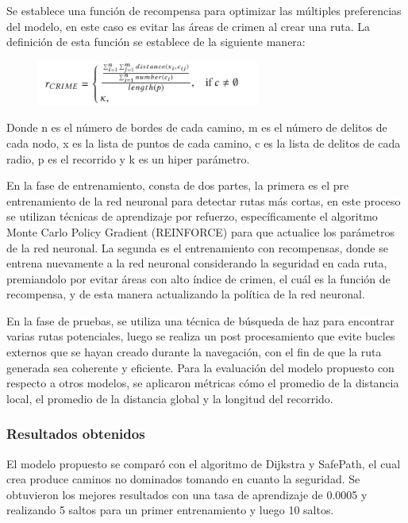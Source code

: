 Se establece una función de recompensa para optimizar las múltiples preferencias del modelo, en este caso es evitar las áreas de crimen al crear una ruta. La definición de esta función se establece de la siguiente manera:
\begin{figure}[h]
	\begin{center}
		\includegraphics[width=0.65\textwidth]{2/figures/EcuacSafe.jpg}
	\end{center}
\end{figure}

Donde n es el número de bordes de cada camino, m es el número de delitos de cada nodo, x es la lista de puntos de cada camino, c es la lista de delitos de cada radio, p es el recorrido y k es un hiper parámetro.

En la fase de entrenamiento, consta de dos partes, la primera es el pre entrenamiento de la red neuronal para detectar rutas más cortas, en este proceso se utilizan técnicas de aprendizaje por refuerzo, específicamente el algoritmo Monte Carlo Policy Gradient (REINFORCE) para que actualice los parámetros de la red neuronal. La segunda es el entrenamiento con recompensas, donde se entrena nuevamente a la red neuronal considerando la seguridad en cada ruta, premiandolo por evitar áreas con alto índice de crimen, el cuál es la función de recompensa, y de esta manera actualizando la política de la red neuronal.

En la fase de pruebas, se utiliza una técnica de búsqueda de haz para encontrar varias rutas potenciales, luego se realiza un post procesamiento que evite bucles externos que se hayan creado durante la navegación, con el fin de que la ruta generada sea coherente y eficiente.
Para la evaluación del modelo propuesto con respecto a otros modelos, se aplicaron métricas cómo el promedio de la distancia local, el promedio de la distancia global y la longitud del recorrido. 

\subsubsection{Resultados obtenidos}
El modelo propuesto se comparó con el algoritmo de Dijkstra y SafePath, el cual crea produce caminos no dominados tomando en cuanto la seguridad. Se obtuvieron los mejores resultados con una tasa de aprendizaje de 0.0005 y realizando 5 saltos para un primer entrenamiento y luego 10 saltos. %

